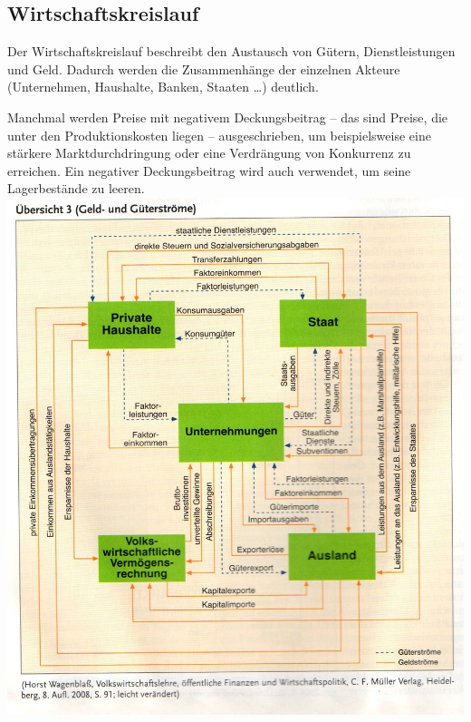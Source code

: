 
\subsection{Wirtschaftskreislauf}

Der Wirtschaftskreislauf beschreibt den Austausch von Gütern, Dienstleistungen und Geld. Dadurch werden die Zusammenhänge der einzelnen Akteure (Unternehmen, Haushalte, Banken, Staaten \dots) deutlich.

Manchmal werden Preise mit negativem Deckungsbeitrag -- das sind Preise, die unter den Produktionskosten liegen -- ausgeschrieben, um beispielsweise eine stärkere Marktdurchdringung oder eine Verdrängung von Konkurrenz zu erreichen. Ein negativer Deckungsbeitrag wird auch verwendet, um seine Lagerbestände zu leeren. \\
\includegraphics[scale=1.0]{pictures/lf01-pic/lf01-wirtschaftskreislauf.jpg}


